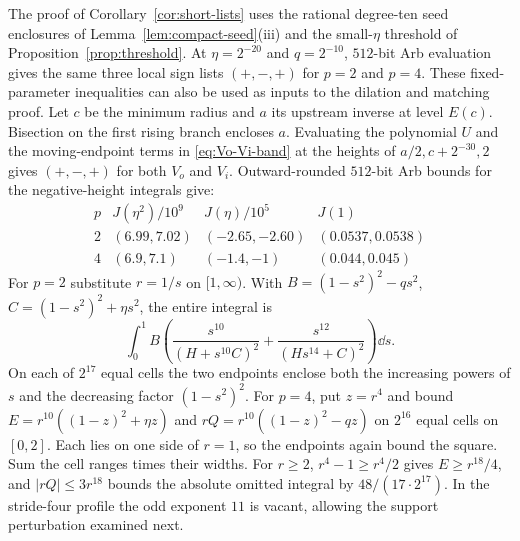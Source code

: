 \begin{remark}\label{rem:fixed-low-profiles}
The proof of Corollary~\ref{cor:short-lists} uses the rational
degree-ten seed enclosures of Lemma~\ref{lem:compact-seed}\textup{(iii)}
and the small-$\eta$ threshold of Proposition~\ref{prop:threshold}.
At $\eta=2^{-20}$ and $q=2^{-10}$, $512$-bit Arb evaluation
\cite{Johansson2017} gives the same three local sign lists $(+,-,+)$
for $p=2$ and $p=4$. These fixed-parameter inequalities can also be used
as inputs to the dilation and matching proof.
Let $c$ be the minimum radius and $a$ its
upstream inverse at level $E(c)$. Bisection on the first rising branch
encloses $a$. Evaluating the polynomial $U$ and the moving-endpoint terms
in \eqref{eq:Vo-Vi-band} at the heights of $a/2,c+2^{-30},2$ gives
$(+,-,+)$ for both $V_o$ and $V_i$. Outward-rounded $512$-bit Arb bounds
for the negative-height integrals give:
\[
\begin{array}{c|ccc}
 p & J(\eta^2)/10^9 & J(\eta)/10^5 & J(1)\\ \hline
 2 & (6.99,7.02)&(-2.65,-2.60)&(0.0537,0.0538)\\
 4 & (6.9,7.1)&(-1.4,-1)&(0.044,0.045)
\end{array}
\]
For $p=2$ substitute $r=1/s$ on $[1,\infty)$. With
$B=(1-s^2)^2-qs^2$, $C=(1-s^2)^2+\eta s^2$, the entire integral is
\[
 \int_0^1 B\left(\frac{s^{10}}{(H+s^{10}C)^2}
                     +\frac{s^{12}}{(Hs^{14}+C)^2}\right)\dd s .
\]
On each of $2^{17}$ equal cells the two endpoints enclose both the
increasing powers of $s$ and the decreasing factor $(1-s^2)^2$.
For $p=4$, put $z=r^4$ and bound $E=r^{10}((1-z)^2+\eta z)$ and
$rQ=r^{10}((1-z)^2-qz)$ on $2^{16}$ equal cells on $[0,2]$.
Each lies on one side of $r=1$, so the endpoints again bound the square.
Sum the cell ranges times their widths. For $r\ge2$, $r^4-1\ge r^4/2$
gives $E\ge r^{18}/4$, and $|rQ|\le3r^{18}$ bounds the absolute
omitted integral by $48/(17\cdot2^{17})$.
In the stride-four profile the odd exponent $11$ is vacant, allowing
the support perturbation examined next.
\end{remark}


